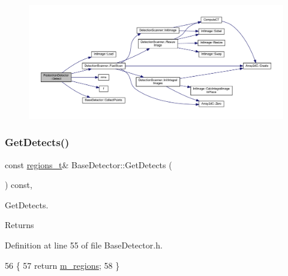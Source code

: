 \begin{figure}[H]
\begin{center}
\leavevmode
\includegraphics[width=350pt]{class_pedestrian_detector_a27a7c2c3b358f6e44a7de71f808597c2_cgraph}
\end{center}
\end{figure}
\mbox{\label{class_base_detector_a52ac4b2feed15a47de84a69eb45c233f}} 
\subsubsection{\texorpdfstring{Get\+Detects()}{GetDetects()}}
{\footnotesize\ttfamily const \mbox{\hyperlink{defines_8h_a01db0de56a20f4342820a093c5154536}{regions\+\_\+t}}\& Base\+Detector\+::\+Get\+Detects (\begin{DoxyParamCaption}{ }\end{DoxyParamCaption}) const\hspace{0.3cm}{\ttfamily [inline]}, {\ttfamily [inherited]}}



Get\+Detects. 

\begin{DoxyReturn}{Returns}

\end{DoxyReturn}


Definition at line 55 of file Base\+Detector.\+h.


\begin{DoxyCode}
56     \{
57         \textcolor{keywordflow}{return} \mbox{\hyperlink{class_base_detector_a409c20093acba261db8354ca72058fce}{m\_regions}};
58     \}
\end{DoxyCode}
\mbox{\label{class_pedestrian_detector_a630d8ad4d8ca2123639e989b01c8dd3e}} 

